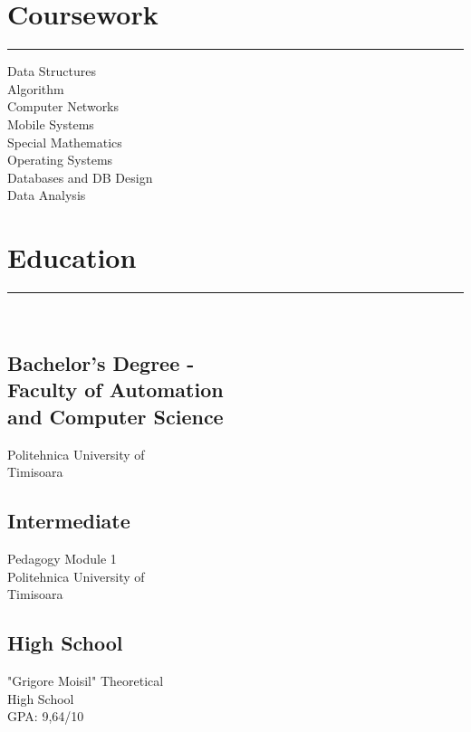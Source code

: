 \documentclass[]{mihocandreea-resume}
\begin{document}
\begin{minipage}[t]{0.33\textwidth}
\sectionsep
\section{Coursework}
\noindent\rule{5cm}{0.4pt}

Data Structures\\
Algorithm\\
Computer Networks\\
Mobile Systems\\
Special Mathematics\\
Operating Systems\\
Databases and DB Design\\
Data Analysis
\sectionsep
\section{Education} 
\noindent\rule{5cm}{0.4pt}\\
\subsection{Bachelor's Degree -\\
Faculty of Automation\\
and Computer Science}
Politehnica University of \\
Timisoara \\
\vspace{8pt}
\subsection{Intermediate}
Pedagogy Module 1\\
Politehnica University of \\
Timisoara\\
\vspace{8pt}
\subsection{High School}
"Grigore Moisil" Theoretical\\
High School\\
GPA: 9,64/10
\sectionsep
%
%

\end{minipage} 
\end{document}
